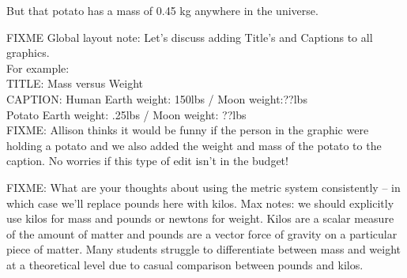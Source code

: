 But that potato has a mass of 0.45 kg anywhere in the universe.

FIXME Global layout note: Let's discuss adding Title's and Captions to all graphics.\\

For example:\\
TITLE: Mass versus Weight\\
CAPTION: Human Earth weight: 150lbs / Moon weight:??lbs\\
Potato Earth weight: .25lbs / Moon weight: ??lbs \\

FIXME: 
Allison thinks it would be funny if the person in the graphic were holding a potato and we also added the weight and mass of the  potato to the caption. No worries if this type of edit isn't in the budget! 

FIXME: What are your thoughts about using the metric system consistently -- in which case we'll replace pounds here with kilos. Max notes: we should explicitly use kilos for mass and pounds or newtons for weight. Kilos are a scalar measure of the amount of matter and pounds are a vector force of gravity on a particular piece of matter. Many students struggle to differentiate between mass and weight at a theoretical level due to casual comparison between pounds and kilos. 
